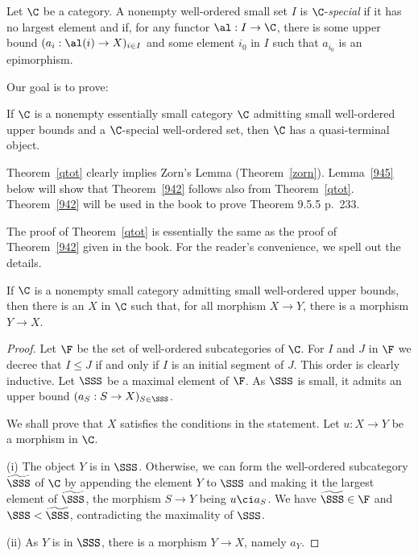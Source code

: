 \documentclass[12pt]{article}
\theoremstyle{remark}
\theoremstyle{definition}
\begin{document}
\begin{df} 
Let $\C$ be a category. A nonempty well-ordered small set $I$ is $\C$-{\em special} if it has no largest element and if, for any functor $\al:I\to\C$, there is some upper bound $(a_i:\al(i)\to X)_{i\in I}$ and some element $i_0$ in $I$ such that $a_{i_0}$ is an epimorphism. 
\end{df}

Our goal is to prove:

\begin{thm}
If $\C$ is a nonempty essentially small category $\C$ admitting small well-ordered upper bounds and a $\C$-special well-ordered set, then $\C$ has a quasi-terminal object.
\end{thm}

Theorem~\ref{qtot} clearly implies Zorn's Lemma (Theorem~\ref{zorn}). Lemma~\ref{945} below will show that Theorem~\ref{942} follows also from Theorem~\ref{qtot}. Theorem~\ref{942} will be used in the book to prove Theorem 9.5.5 p.~233.

The proof of Theorem~\ref{qtot} is essentially the same as the proof of Theorem~\ref{942} given in the book. For the reader's convenience, we spell out the details. 

\begin{lem}
If $\C$ is a nonempty small category admitting small well-ordered upper bounds, then there is an $X$ in $\C$ such that, for all morphism $X\to Y$, there is a morphism $Y\to X$.
\end{lem}

\begin{proof}
Let $\F$ be the set of well-ordered subcategories of $\C$. For $I$ and $J$ in $\F$ we decree that $I\le J$ if and only if $I$ is an initial segment of $J$. This order is clearly inductive. Let $\SSS$ be a maximal element of $\F$. As $\SSS$ is small, it admits an upper bound $(a_S:S\to X)_{S\in\SSS}$. 

We shall prove that $X$ satisfies the conditions in the statement. Let $u:X\to Y$ be a morphism in $\C$. 

\nn(i) The object $Y$ is in $\SSS$. Otherwise, we can form the well-ordered subcategory $\widetilde\SSS$ of $\C$ by appending the element $Y$ to $\SSS$ and making it the largest element of $\widetilde\SSS$, the morphism $S\to Y$ being $u\ci a_S$. We have $\widetilde\SSS\in\F$ and $\SSS<\widetilde\SSS$, contradicting the maximality of $\SSS$. 

\nn(ii) As $Y$ is in $\SSS$, there is a morphism $Y\to X$, namely $a_Y$.
\end{proof} 
\end{document}
